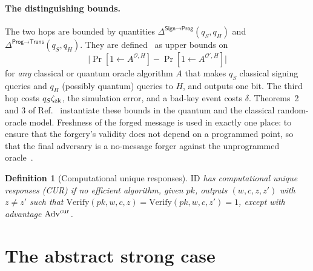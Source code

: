 \documentclass[aps,prx,reprint,superscriptaddress,nofootinbib,floatfix]{revtex4-2}
\newtheorem{definition}{Definition}
\theoremstyle{remark}
\newcommand{\Adv}{\mathrm{Adv}}
\newcommand{\Sign}{\textsf{Sign}}
\begin{document}
\paragraph*{The distinguishing bounds.} The two hops are bounded by quantities $\Delta^{\Sign\to\textsf{Prog}}(q_S,q_H)$ and $\Delta^{\textsf{Prog}\to\textsf{Trans}}(q_S,q_H)$. They are defined~\cite[Sec.~3]{fsa-fix} as upper bounds on
\[
\bigl|\Pr[1\gets A^{\mathcal O,H}]-\Pr[1\gets A^{\mathcal O',H}]\bigr|
\]
for \emph{any} classical or quantum oracle algorithm $A$ that makes $q_S$ classical signing queries and $q_H$ (possibly quantum) queries to $H$, and outputs one bit. The third hop costs $q_S\zeta_{\rm zk}$, the simulation error, and a bad-key event costs $\delta$. Theorems~2 and 3 of Ref.~\cite{fsa-fix} instantiate these bounds in the quantum and the classical random-oracle model. Freshness of the forged message is used in exactly one place: to ensure that the forgery's validity does not depend on a programmed point, so that the final adversary is a no-message forger against the unprogrammed oracle~\cite[proof of Lemma~1]{fsa-fix}.

\begin{definition}[Computational unique responses]
$\mathrm{ID}$ has computational unique responses (CUR) if no efficient algorithm, given $\mathit{pk}$, outputs $(w,c,z,z')$ with $z\neq z'$ such that $\mathrm{Verify}(\mathit{pk},w,c,z)=\mathrm{Verify}(\mathit{pk},w,c,z')=1$, except with advantage $\Adv^{\rm cur}$.
\end{definition}

\section{The abstract strong case}
\end{document}
